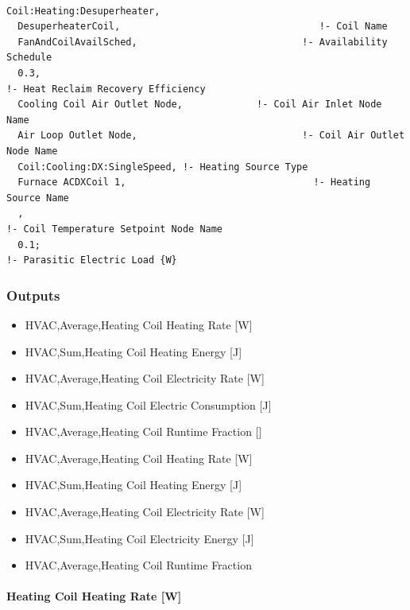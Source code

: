 \begin{lstlisting}

Coil:Heating:Desuperheater,
  DesuperheaterCoil,                                   !- Coil Name
  FanAndCoilAvailSched,                             !- Availability Schedule
  0.3,                                                               !- Heat Reclaim Recovery Efficiency
  Cooling Coil Air Outlet Node,             !- Coil Air Inlet Node Name
  Air Loop Outlet Node,                             !- Coil Air Outlet Node Name
  Coil:Cooling:DX:SingleSpeed, !- Heating Source Type
  Furnace ACDXCoil 1,                                 !- Heating Source Name
  ,                                                                     !- Coil Temperature Setpoint Node Name
  0.1;                                                               !- Parasitic Electric Load {W}
\end{lstlisting}

\subsubsection{Outputs}\label{outputs-4-006}

\begin{itemize}
\item
  HVAC,Average,Heating Coil Heating Rate {[}W{]}
\item
  HVAC,Sum,Heating Coil Heating Energy {[}J{]}
\item
  HVAC,Average,Heating Coil Electricity Rate {[}W{]}
\item
  HVAC,Sum,Heating Coil Electric Consumption {[}J{]}
\item
  HVAC,Average,Heating Coil Runtime Fraction {[]}
\item
  HVAC,Average,Heating Coil Heating Rate {[}W{]}
\item
  HVAC,Sum,Heating Coil Heating Energy {[}J{]}
\item
  HVAC,Average,Heating Coil Electricity Rate {[}W{]}
\item
  HVAC,Sum,Heating Coil Electricity Energy {[}J{]}
\item
  HVAC,Average,Heating Coil Runtime Fraction
\end{itemize}

\paragraph{Heating Coil Heating Rate {[}W{]}}\label{heating-coil-heating-rate-w-3}

